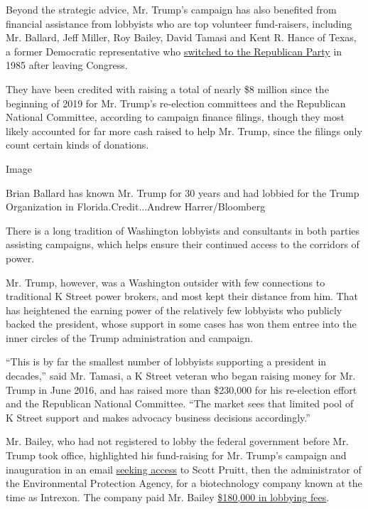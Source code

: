 Beyond the strategic advice, Mr. Trump's campaign has also benefited
from financial assistance from lobbyists who are top volunteer
fund-raisers, including Mr. Ballard, Jeff Miller, Roy Bailey, David
Tamasi and Kent R. Hance of Texas, a former Democratic representative
who
\href{https://www.nytimes.com/1985/05/04/us/in-blow-to-texas-democrats-ex-rep-hance-joins-republicans.html}{switched
to the Republican Party} in 1985 after leaving Congress.

They have been credited with raising a total of nearly \$8 million since
the beginning of 2019 for Mr. Trump's re-election committees and the
Republican National Committee, according to campaign finance filings,
though they most likely accounted for far more cash raised to help Mr.
Trump, since the filings only count certain kinds of donations.

Image

Brian Ballard has known Mr. Trump for 30 years and had lobbied for the
Trump Organization in Florida.Credit...Andrew Harrer/Bloomberg

There is a long tradition of Washington lobbyists and consultants in
both parties assisting campaigns, which helps ensure their continued
access to the corridors of power.

Mr. Trump, however, was a Washington outsider with few connections to
traditional K Street power brokers, and most kept their distance from
him. That has heightened the earning power of the relatively few
lobbyists who publicly backed the president, whose support in some cases
has won them entree into the inner circles of the Trump administration
and campaign.

``This is by far the smallest number of lobbyists supporting a president
in decades,'' said Mr. Tamasi, a K Street veteran who began raising
money for Mr. Trump in June 2016, and has raised more than \$230,000 for
his re-election effort and the Republican National Committee. ``The
market sees that limited pool of K Street support and makes advocacy
business decisions accordingly.''

Mr. Bailey, who had not registered to lobby the federal government
before Mr. Trump took office, highlighted his fund-raising for Mr.
Trump's campaign and inauguration in an email
\href{https://www.documentcloud.org/documents/6958438-Seeking-a-Meeting-at-the-E-P-A-Lobbyist-Touts.html}{seeking
access} to Scott Pruitt, then the administrator of the Environmental
Protection Agency, for a biotechnology company known at the time as
Intrexon. The company paid Mr. Bailey
\href{https://soprweb.senate.gov/index.cfm?event=getFilingDetails\&filingID=340EDCB1-9935-4424-BBEE-DCC81397D937\&filingTypeID=78}{\$180,000
in lobbying fees}.

